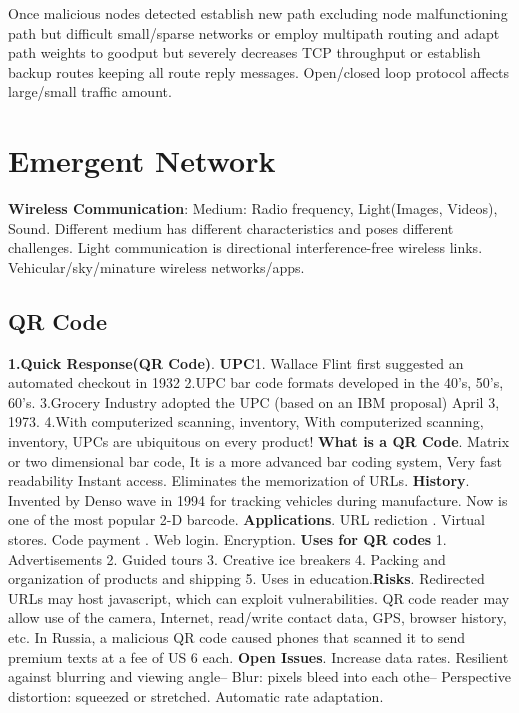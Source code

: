 \documentclass[9pt]{extarticle}
\begin{document}
\begin{multicols}{2}
Once malicious nodes detected establish new path excluding node malfunctioning path but difficult small/sparse networks or employ multipath routing and adapt path weights to goodput but severely decreases TCP throughput or establish backup routes keeping all route reply messages. Open/closed loop protocol affects large/small traffic amount.

\section{Emergent Network}

\textbf{Wireless Communication}: Medium: Radio frequency, Light(Images, Videos), Sound. Different medium has different characteristics and poses different challenges. Light communication is directional interference-free wireless links. Vehicular/sky/minature wireless networks/apps.

\subsection{QR Code}

\textbf{1.Quick Response(QR Code)}. \textbf{UPC}1. Wallace Flint first suggested an automated checkout in 1932 2.UPC bar code formats developed in the 40’s, 50’s, 60’s. 3.Grocery Industry adopted the UPC (based on an IBM proposal) April 3, 1973. 4.With computerized scanning, inventory, With computerized scanning, inventory, UPCs are ubiquitous on every product! \textbf{What is a QR Code}. Matrix or two dimensional bar code, It is a more advanced bar coding system, Very fast readability Instant access. Eliminates the memorization of URLs. \textbf{History}. Invented by Denso wave in 1994 for tracking vehicles during manufacture. Now is one of the most popular 2-D barcode. \textbf{Applications}. URL rediction . Virtual stores. Code payment . Web login. Encryption. \textbf{Uses for QR codes} 1. Advertisements 2. Guided tours 3. Creative ice breakers 4. Packing and organization of products and shipping 5. Uses in education.\textbf{Risks}. Redirected URLs may host javascript, which can exploit vulnerabilities. QR code reader may allow use of the camera, Internet, read/write contact data, GPS, browser history, etc. In Russia, a malicious QR code caused phones that scanned it to send premium texts at a fee of US 6 each.\textbf{ Open Issues}. Increase data rates. Resilient against blurring and viewing angle– Blur: pixels bleed into each othe– Perspective distortion: squeezed or stretched. Automatic rate adaptation.


\end{multicols}
\end{document}
